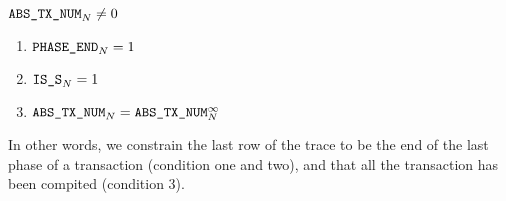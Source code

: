 \If $\texttt{ABS\_TX\_NUM}_{N} \neq 0$ \Then
\begin{enumerate}
    \item $\texttt{PHASE\_END}_{N} = 1$
    \item $\texttt{IS\_S}_{N} = 1$
    \item $\texttt{ABS\_TX\_NUM}_{N} = \texttt{ABS\_TX\_NUM}_{N}^{\infty}$
\end{enumerate}
In other words, we constrain the last row of the trace to be the end of the last phase of a transaction (condition one and two), and that all the transaction has been compited (condition 3).
